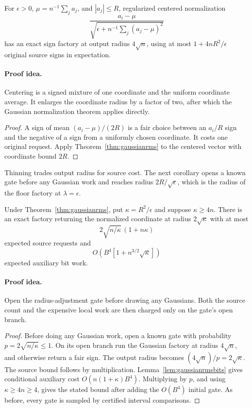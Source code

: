 \begin{corollary}
\label{cor:gelulayernorm}
For $\epsilon>0$, $\mu=n^{-1}\sum_j a_j$, and $|a_j|\le R$, regularized centered
normalization
\[
 \frac{a_i-\mu}{\sqrt{\epsilon+n^{-1}\sum_j(a_j-\mu)^2}}
\]
has an exact sign factory at output radius $4\sqrt n$, using at most
$1+4nR^2/\epsilon$ original source signs in expectation.
\end{corollary}
\paragraph{Proof idea.}
Centering is a signed mixture of one coordinate and the uniform
coordinate average. It enlarges the coordinate radius by a factor of two,
after which the Gaussian normalization theorem applies directly.

\begin{proof}
A sign of mean $(a_i-\mu)/(2R)$ is a fair choice between an $a_i/R$
sign and the negative of a sign from a uniformly chosen coordinate.
It costs one original request. Apply Theorem~\ref{thm:gaussianrms}
to the centered vector with coordinate bound $2R$.
\end{proof}

Thinning trades output radius for source cost. The next corollary
opens a known gate before any Gaussian work and reaches radius
$2R/\sqrt\epsilon$, which is the radius of the floor factory at
$\lambda=\epsilon$.

\begin{corollary}
\label{cor:gaussian-large-radius}
Under Theorem~\ref{thm:gaussianrms}, put $\kappa=R^2/\epsilon$ and
suppose $\kappa\ge4n$.  There is an exact factory returning the
normalized coordinate at radius $2\sqrt\kappa$ with at most
\[
 2\sqrt{n/\kappa}\,(1+n\kappa)
\]
expected source requests and
\[
 O\!\left(B^4[1+n^{3/2}\sqrt\kappa]\right)
\]
expected auxiliary bit work.
\end{corollary}
\paragraph{Proof idea.}
Open the radius-adjustment gate before drawing any Gaussians.
Both the source count and the expensive local work are then charged only
on the gate's open branch.

\begin{proof}
Before doing any Gaussian work, open a known gate with probability
$p=2\sqrt{n/\kappa}\le1$.  On its open branch run the Gaussian
factory at radius $4\sqrt n$, and otherwise return a fair sign.
The output radius becomes $(4\sqrt n)/p=2\sqrt\kappa$.
The source bound follows by multiplication.
Lemma~\ref{lem:gaussianrmsbits} gives conditional auxiliary cost
$O(n(1+\kappa)B^4)$.  Multiplying by $p$, and using
$\kappa\ge4n\ge4$, gives the stated bound after adding the
$O(B^4)$ initial gate.  As before, every gate is sampled by certified
interval comparisons.
\end{proof}

